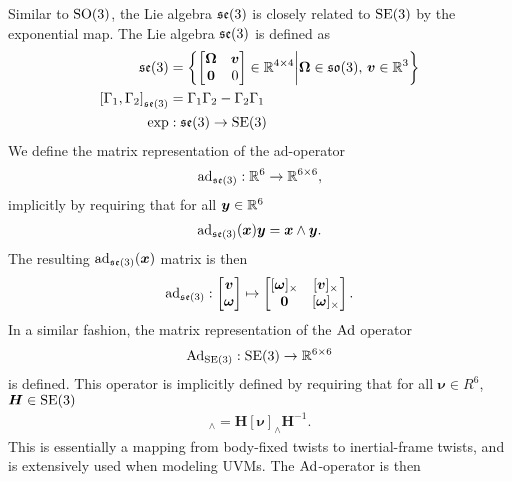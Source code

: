 Similar to $\operatorname{SO}(3)$, the Lie algebra $\mathfrak{se}(3)$ is closely related to $\operatorname{SE}(3)$ by the exponential
map. The Lie algebra $\mathfrak{se}(3)$ is defined as
\begin{subequations}
    \label{eq:se3_algebra}
\begin{align}
    \mathfrak{se}(3) &= \left\{ \begin{bmatrix}
        \bm{\Omega} & \bm{v} \\
        \bm{0} & 0
    \end{bmatrix}
    \in \mathbb{R}^{4 \times 4}
    \middle|
    \bm{\Omega} \in \mathfrak{so}(3), \, \bm{v} \in \mathbb{R}^3
    \right\} \\
    \left[ \Gamma_1, \Gamma_2 \right]_{\mathfrak{se}(3)} &= \Gamma_1 \Gamma_2 - \Gamma_2 \Gamma_1 \\
    \exp &: \mathfrak{se}(3) \to \operatorname{SE}(3)
\end{align}
\end{subequations}
We define the matrix representation of the ad-operator
\begin{align}
    \operatorname{ad}_{\mathfrak{se}(3)} : \mathbb{R}^6 \to \mathbb{R}^{6 \times 6},
\end{align}
implicitly by requiring that for all $\bm{y} \in \mathbb{R}^6$
\begin{align}
    \operatorname{ad}_{\mathfrak{se}(3)}( \bm{x} ) \bm{y} = \bm{x} \wedge \bm{y}. \label{eq:ad_impl}
\end{align}
The resulting $\operatorname{ad}_{\mathfrak{se}(3)}(\bm{x})$ matrix is then
\begin{align}
    \operatorname{ad}_{\mathfrak{se}(3)} : \begin{bmatrix} \bm{v} \\ \bm{\omega} \end{bmatrix}
        \mapsto \begin{bmatrix}
            [\bm{\omega}]_{\times} & [\bm{v}]_{\times} \\
            \bm{0} & [\bm{\omega}]_{\times}
        \end{bmatrix}.
\end{align}
In a similar fashion, the matrix representation of the $\operatorname{Ad}$ operator
\begin{align}
    \operatorname{Ad}_{\operatorname{SE}(3)} : \operatorname{SE}(3) \to \mathbb{R}^{6 \times 6}
\end{align}
is defined. This operator is implicitly defined by requiring that for all
$\bm{\nu} \in R^6$, $\bm{H} \in \operatorname{SE}(3)$
\begin{align}
    [\Ad_{\SE}(\bm{H})\bm{\nu}]_{\wedge} = \bm{H} [\bm{\nu}]_{\wedge} \bm{H}^{-1}.
\end{align}
This is essentially a mapping from body-fixed twists to inertial-frame twists,
and is extensively used when modeling UVMs. The $\operatorname{Ad}$-operator is then
